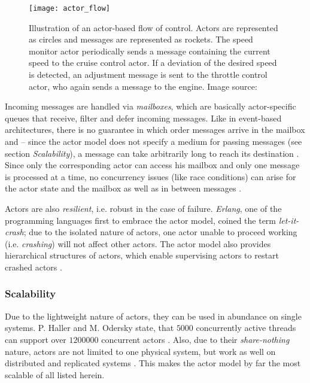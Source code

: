 \begin{figure}
\centering\small
\setlength{\tabcolsep}{0mm}
  \texttt{[image: actor\_flow]}
\caption{
Illustration of an actor-based flow of control. Actors are represented as circles and messages are represented as rockets. The speed monitor actor periodically sends a message containing the current speed to the cruise control actor. If a deviation of the desired speed is detected, an adjustment message is sent to the throttle control actor, who again sends a message to the engine. Image source: \cite{Haller2011}
}
\label{fig:actor_flow}
\end{figure}

Incoming messages are handled via \textit{mailboxes}, which are basically actor-specific queues that receive, filter and defer incoming messages. Like in event-based architectures, there is no guarantee in which order messages arrive in the mailbox and -- since the actor model does not specify a medium for passing messages (see section \textit{Scalability}), a message can take arbitrarily long to reach its destination \cite[97]{Erb2012}. Since only the corresponding actor can access his mailbox and only one message is processed at a time, no concurrency issues (like race conditions) can arise for the actor state and the mailbox as well as in between messages \cite[p. 12]{Eriksson2013}.

Actors are also \textit{resilient}, i.e. robust in the case of failure. \textit{Erlang}, one of the programming languages first to embrace the actor model, coined the term \textit{let-it-crash}; due to the isolated nature of actors, one actor unable to proceed working (i.e. \textit{crashing}) will not affect other actors. The actor model also provides hierarchical structures of actors, which enable supervising actors to restart crashed actors \cite{Armstrong2007}.

\subsubsection*{Scalability}
Due to the lightweight nature of actors, they can be used in abundance on single systems. P. Haller and M. Odersky state, that $5000$ concurrently active threads can support over $1200000$ concurrent actors \cite[p. 2]{Haller2009}. Also, due to their \textit{share-nothing} nature, actors are not limited to one physical system, but work as well on distributed and replicated systems \cite[p. 233]{Gupta2012}. This makes the actor model by far the most scalable of all listed herein. 

